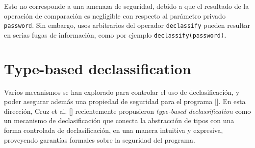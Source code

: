 	Esto no corresponde a una amenaza de seguridad, debido a que el resultado de la operación de comparación es negligible con respecto al parámetro privado \texttt{password}. Sin embargo, usos arbitrarios del operador \texttt{declassify} pueden resultar en serias fugas de información, como por ejemplo \texttt{declassify(password)}.

	\section{Type-based declassification}

	Varios mecanismos se han explorado para controlar el uso de declasificación, y poder asegurar además una propiedad de seguridad para el programa []. En esta dirección, Cruz et al. [] recientemente propusieron \textit{type-based declassification} como un mecanismo de declasificación que conecta la abstracción de tipos con una forma controlada de declasificación, en una manera intuitiva y expresiva, proveyendo garantías formales sobre la seguridad del programa. %

	
